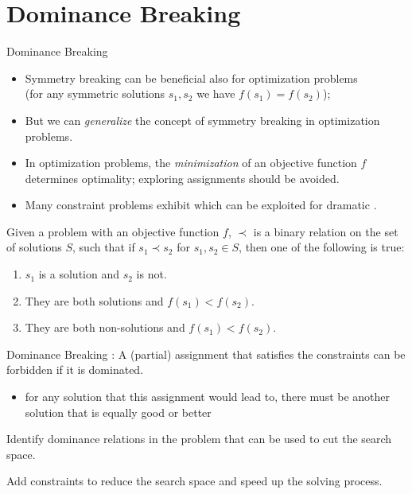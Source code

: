\documentclass{cons-beamer}
\begin{document}
\section{Dominance Breaking}

\begin{frame}{Dominance Breaking}
  \small
  \begin{itemize}
    \item Symmetry breaking can be beneficial also for optimization problems\\ (for any symmetric solutions $s_1, s_2$ we have $f(s_1) = f(s_2)$); 
    \vfill
    
    \item But we can \textit{generalize} the concept of symmetry breaking in optimization problems.
    \vfill
    
    \item In optimization problems, the \textit{minimization} of an objective function $f$ determines optimality; exploring  assignments should be avoided.
    \vfill
    
    \item Many constraint problems exhibit  which can be exploited for dramatic .
  \end{itemize}
  \vfill 
  \begin{definition}
    Given a problem with an objective function $f$,  $\prec$ is a binary relation on the set of solutions $S$, such that if $s_1 \prec s_2$ for $s_1, s_2 \in S$, then one of the following is true:
    \begin{enumerate} 
      \item $s_1$ is a solution and $s_2$ is not.
      \item They are both solutions and $f(s_1) < f(s_2)$.
      \item They are both non-solutions and $f(s_1) < f(s_2)$.
    \end{enumerate}  
  \end{definition}
\end{frame}

\begin{frame}{Dominance Breaking}
  : A (partial) assignment that satisfies the constraints can be forbidden if it is dominated.
  \begin{itemize}
    \item for any solution that this assignment would lead to, there must be another solution that is equally good or better
  \end{itemize}
  \vfill

  Identify dominance relations in the problem that can be used to cut the search space.
  \vfill

  Add  constraints to reduce the search space and speed up the solving process.
\end{frame}
\end{document}

